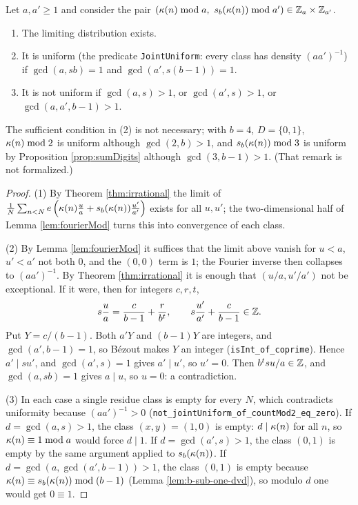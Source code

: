 \begin{theorem}[Theorem 5.7]
  \label{thm:modularJoint}
  \leanok
  Let $a, a' \geq 1$ and consider the pair
  $(\enum(n) \bmod a,\ \sd(\enum(n)) \bmod a') \in \Z_a \times \Z_{a'}$.
  \begin{enumerate}
    \item The limiting distribution exists.
    \item It is uniform (the predicate \texttt{JointUniform}: every class has
      density $(aa')^{-1}$) if $\gcd(a,sb) = 1$ and $\gcd(a',s(b-1)) = 1$.
    \item It is not uniform if $\gcd(a,s) > 1$, or $\gcd(a',s) > 1$, or
      $\gcd(a,a',b-1) > 1$.
  \end{enumerate}
  The sufficient condition in (2) is not necessary; with $b=4$, $D=\{0,1\}$,
  $\kappa(n) \bmod 2$ is uniform although $\gcd(2,b)>1$, and
  $s_b(\kappa(n)) \bmod 3$ is uniform by Proposition \ref{prop:sumDigits}
  although $\gcd(3,b-1)>1$. (That remark is not formalized.)
\end{theorem}
\begin{proof}
  \leanok
  (1) By Theorem \ref{thm:irrational} the limit of
  $\frac1N\sum_{n<N}e\left(\kappa(n)\frac ua + s_b(\kappa(n))\frac{u'}{a'}\right)$ exists
  for all $u,u'$; the two-dimensional half of Lemma \ref{lem:fourierMod} turns
  this into convergence of each class.

  (2) By Lemma \ref{lem:fourierMod} it suffices that the limit above vanish for
  $u < a$, $u' < a'$ not both $0$, and the $(0,0)$ term is $1$; the Fourier
  inverse then collapses to $(aa')^{-1}$. By Theorem \ref{thm:irrational} it is
  enough that $(u/a, u'/a')$ not be exceptional. If it were, then for integers
  $c, r, t$,
  \[
    s\frac ua = \frac{c}{b-1} + \frac{r}{b^t}, \qquad
    s\frac{u'}{a'} + \frac{c}{b-1} \in \mathbb{Z} .
  \]
  Put $Y = c/(b-1)$. Both $a'Y$ and $(b-1)Y$ are integers, and
  $\gcd(a',b-1)=1$, so B\'ezout makes $Y$ an integer
  (\texttt{isInt\_of\_coprime}). Hence $a' \mid su'$, and $\gcd(a',s)=1$ gives
  $a' \mid u'$, so $u' = 0$. Then $b^tsu/a \in \mathbb{Z}$, and $\gcd(a,sb)=1$ gives
  $a \mid u$, so $u = 0$: a contradiction.

  (3) In each case a single residue class is empty for every $N$, which
  contradicts uniformity because $(aa')^{-1} > 0$
  (\texttt{not\_jointUniform\_of\_countMod2\_eq\_zero}). If
  $d = \gcd(a,s) > 1$, the class $(x,y) = (1,0)$ is empty: $d \mid \kappa(n)$
  for all $n$, so $\kappa(n) \equiv 1 \bmod a$ would force $d \mid 1$. If
  $d = \gcd(a',s) > 1$, the class $(0,1)$ is empty by the same argument applied
  to $s_b(\kappa(n))$. If $d = \gcd(a,\gcd(a',b-1)) > 1$, the class $(0,1)$ is
  empty because $\kappa(n) \equiv s_b(\kappa(n)) \bmod (b-1)$
  (Lemma \ref{lem:b-sub-one-dvd}), so modulo $d$ one would get $0 \equiv 1$.
\end{proof}

